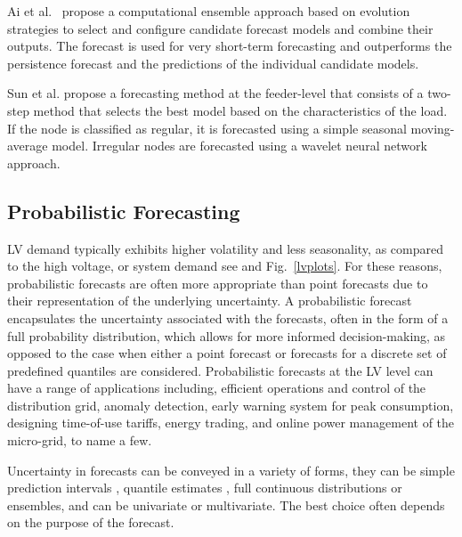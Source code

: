 Ai et al.~\cite{ai2019hpd} propose a computational ensemble approach based on evolution strategies to select and configure candidate forecast models and combine their outputs. The forecast is used for very short-term forecasting and outperforms the persistence forecast and the predictions of the individual candidate models.

Sun et al.\cite{sun2015aea} propose a forecasting method at the feeder-level that consists of a two-step method that selects the best model based on the characteristics of the load. If the node is classified as regular, it is forecasted using a simple seasonal moving-average model. Irregular nodes are forecasted using a wavelet neural network approach.


\subsection{Probabilistic Forecasting} 
\label{section_prob} 
LV demand typically exhibits higher volatility and less seasonality, as compared to the high voltage, or system demand see \cite{Haben2019stl} and Fig.~\ref{lvplots}. For these reasons, probabilistic forecasts are often more appropriate than point forecasts due to their representation of the underlying uncertainty. A probabilistic forecast encapsulates the uncertainty associated with the forecasts, often in the form of a full probability distribution, which allows for more informed decision-making, as opposed to the case when either a point forecast or forecasts for a discrete set of predefined quantiles are considered. Probabilistic forecasts at the LV level can have a range of applications including, efficient operations and control of the distribution grid, anomaly detection, early warning system for peak consumption, designing time-of-use tariffs, energy trading, and online power management of the micro-grid, to name a few.

Uncertainty in forecasts can be conveyed in a variety of forms, they can be simple prediction intervals \cite{kodaira2020oes}, quantile estimates \cite{gerossier2018rda}, full continuous distributions \cite{pinto2017mpf} or ensembles, and can be univariate or multivariate. The best choice often depends on the purpose of the forecast. 

